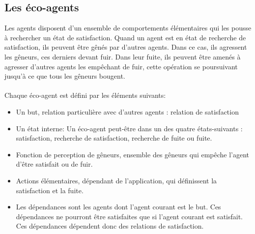 	\subsection{Les éco-agents}
        Les agents disposent d'un ensemble de comportements élémentaires qui les pousse à rechercher un état de satisfaction. Quand un agent est en état de recherche de satisfaction, ils peuvent être gênés par d'autres agents. Dans ce cas, ils agressent les gêneurs, ces derniers devant fuir.  Dans leur fuite, ils peuvent être amenés à agresser d'autres agents les empêchant de fuir, cette opération se poursuivant jusqu'à ce que tous les gêneurs bougent. \\
        \\
        Chaque éco-agent est défini par les éléments suivants:
        \begin{itemize}
        \item Un but, relation particulière avec d'autres agents : relation de satisfaction 
        \item Un état interne:  Un éco-agent peut-être dans un des quatre états-suivants : satisfaction, recherche de satisfaction, recherche de fuite ou fuite. 
        \item Fonction de perception de gêneurs, ensemble des gêneurs qui empêche l'agent d'être satisfait ou de fuir. 
        \item Actions élémentaires, dépendant de l'application, qui définissent la satisfaction et la fuite. 
        \item Les dépendances sont les agents dont l'agent courant est le but. Ces dépendances ne pourront être satisfaites que si l'agent courant est satisfait. Ces dépendances dépendent donc des relations de satisfaction.
        \end{itemize}
        
